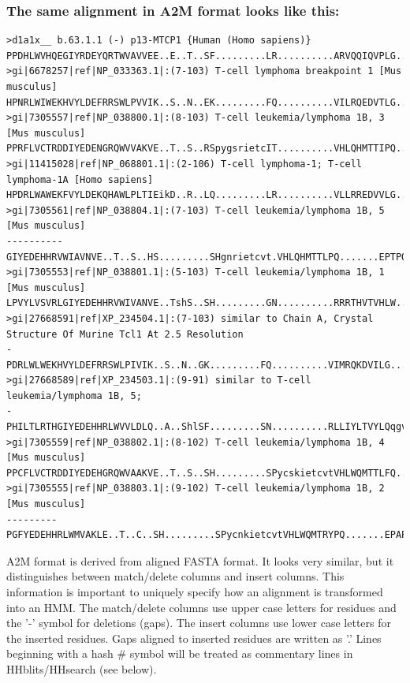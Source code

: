 \documentclass[11pt,a4paper]{article}
\begin{document}
\subsubsection*{The same alignment in A2M format looks like this:}

\scriptsize\begin{verbatim}
>d1a1x__ b.63.1.1 (-) p13-MTCP1 {Human (Homo sapiens)}
PPDHLWVHQEGIYRDEYQRTWVAVVEE..E..T..SF.........LR..........ARVQQIQVPLG.......DAARPSHLLTS.....QLPLMWQLYPEERYMDNNSR
>gi|6678257|ref|NP_033363.1|:(7-103) T-cell lymphoma breakpoint 1 [Mus musculus]
HPNRLWIWEKHVYLDEFRRSWLPVVIK..S..N..EK.........FQ..........VILRQEDVTLG.......EAMSPSQLVPY.....ELPLMWQLYPKDRYRSCDSM
>gi|7305557|ref|NP_038800.1|:(8-103) T-cell leukemia/lymphoma 1B, 3 [Mus musculus]
PPRFLVCTRDDIYEDENGRQWVVAKVE..T..S..RSpygsrietcIT..........VHLQHMTTIPQ.......EPTPQQPINNN.....SLPTMWRLESMNTYTGTDGT
>gi|11415028|ref|NP_068801.1|:(2-106) T-cell lymphoma-1; T-cell lymphoma-1A [Homo sapiens]
HPDRLWAWEKFVYLDEKQHAWLPLTIEikD..R..LQ.........LR..........VLLRREDVVLG.......RPMTPTQIGPS.....LLPIMWQLYPDGRYRSSDSS
>gi|7305561|ref|NP_038804.1|:(7-103) T-cell leukemia/lymphoma 1B, 5 [Mus musculus]
----------GIYEDEHHRVWIAVNVE..T..S..HS.........SHgnrietcvt.VHLQHMTTLPQ.......EPTPQQPINNN.....SLPTMWRLESRNTYTGTDGT
>gi|7305553|ref|NP_038801.1|:(5-103) T-cell leukemia/lymphoma 1B, 1 [Mus musculus]
LPVYLVSVRLGIYEDEHHRVWIVANVE..TshS..SH.........GN..........RRRTHVTVHLW.......KLIPQQVIPFNplnydFLPTTWKLESRNIYWATDGT
>gi|27668591|ref|XP_234504.1|:(7-103) similar to Chain A, Crystal Structure Of Murine Tcl1 At 2.5 Resolution 
-PDRLWLWEKHVYLDEFRRSWLPIVIK..S..N..GK.........FQ..........VIMRQKDVILG.......DSMTPSQLVPY.....ELPLMWQLYPEERYRSSNSE
>gi|27668589|ref|XP_234503.1|:(9-91) similar to T-cell leukemia/lymphoma 1B, 5;
-PHILTLRTHGIYEDEHHRLWVVLDLQ..A..ShlSF.........SN..........RLLIYLTVYLQqgvafplESTPPSPMNLN.....GLPRRWTLRTMGTYEGTDNT
>gi|7305559|ref|NP_038802.1|:(8-102) T-cell leukemia/lymphoma 1B, 4 [Mus musculus] 
PPCFLVCTRDDIYEDEHGRQWVAAKVE..T..S..SH.........SPycskietcvtVHLWQMTTLFQ.......EPSPDSLKTFN.....FLPRTWRLESRNTYRGADAM
>gi|7305555|ref|NP_038803.1|:(9-102) T-cell leukemia/lymphoma 1B, 2 [Mus musculus]
---------PGFYEDEHHRLWMVAKLE..T..C..SH.........SPycnkietcvtVHLWQMTRYPQ.......EPAPYNPMNYN.....FLPMTWRLASMNTYRGTDAM
\end{verbatim}\normalsize

A2M format is derived from aligned FASTA format. It looks very similar, but it 
distinguishes between match/delete columns and insert columns. This information is 
important to uniquely specify how an alignment is transformed into an HMM. The 
match/delete columns use upper case letters for residues and the '-' symbol for 
deletions (gaps). The insert columns use lower case letters for the inserted residues. 
Gaps aligned to inserted residues are written as '.' Lines beginning with a hash \# 
symbol will be treated as commentary lines in HHblits/HHsearch (see below).
\end{document}
